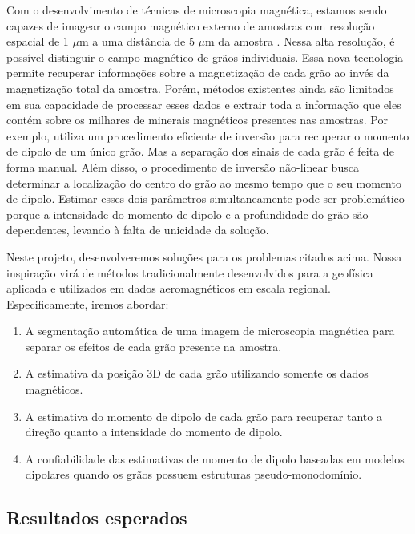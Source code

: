 \documentclass[12pt,a4paper,oneside]{book}
\begin{document}
Com o desenvolvimento de técnicas de microscopia magnética, estamos sendo
capazes de imagear o campo magnético externo de amostras com resolução espacial
de 1 $\mu$m a uma distância de 5 $\mu$m da amostra \citep{Fu2020}.
Nessa alta resolução, é possível distinguir o campo magnético de grãos
individuais.
Essa nova tecnologia permite recuperar informações sobre a magnetização
de cada grão ao invés da magnetização total da amostra.
Porém, métodos existentes ainda são limitados em sua capacidade de processar
esses dados e extrair toda a informação que eles contém sobre os milhares de
minerais magnéticos presentes nas amostras.
Por exemplo, \citet{Fu2020} utiliza um procedimento eficiente de inversão para
recuperar o momento de dipolo de um único grão.
Mas a separação dos sinais de cada grão é feita de forma manual.
Além disso, o procedimento de inversão não-linear busca determinar a
localização do centro do grão ao mesmo tempo que o seu momento de dipolo.
Estimar esses dois parâmetros simultaneamente pode ser problemático porque
a intensidade do momento de dipolo e a profundidade do grão são dependentes,
levando à falta de unicidade da solução.

Neste projeto, desenvolveremos soluções para os problemas citados acima. Nossa
inspiração virá de métodos tradicionalmente desenvolvidos para a geofísica
aplicada e utilizados em dados aeromagnéticos em escala regional.
Especificamente, iremos abordar:

\begin{enumerate}
  \item A segmentação automática de uma imagem de microscopia magnética para
    separar os efeitos de cada grão presente na amostra.
  \item A estimativa da posição 3D de cada grão utilizando somente os dados
    magnéticos.
  \item A estimativa do momento de dipolo de cada grão para recuperar tanto
    a direção quanto a intensidade do momento de dipolo.
  \item A confiabilidade das estimativas de momento de dipolo baseadas em
    modelos dipolares quando os grãos possuem estruturas pseudo-monodomínio.
\end{enumerate}


\subsection{Resultados esperados}
\end{document}
